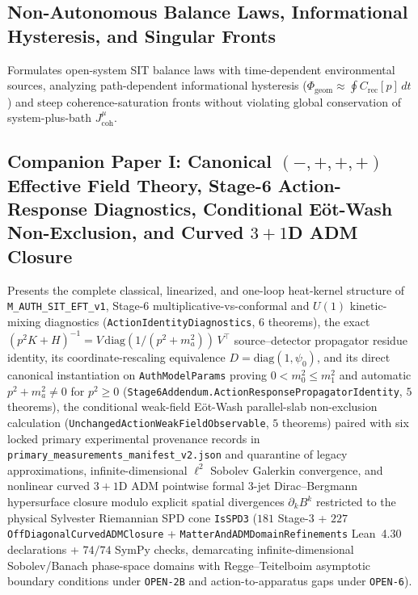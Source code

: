 \subsection{Non-Autonomous Balance Laws, Informational Hysteresis, and Singular Fronts}

Formulates open-system SIT balance laws with time-dependent environmental sources, analyzing path-dependent informational hysteresis ($\Phi_{\mathrm{geom}} \approx \oint C_{\mathrm{rec}}[p]\,dt$) and steep coherence-saturation fronts without violating global conservation of system-plus-bath $J^\mu_{\mathrm{coh}}$.

\subsection{Companion Paper I: Canonical $(-,+,+,+)$ Effective Field Theory, Stage-6 Action-Response Diagnostics, Conditional E\"ot-Wash Non-Exclusion, and Curved $3+1$D ADM Closure}

Presents the complete classical, linearized, and one-loop heat-kernel structure of \texttt{M\_AUTH\_SIT\_EFT\_v1}, Stage-6 multiplicative-vs-conformal and $U(1)$ kinetic-mixing diagnostics (\texttt{ActionIdentityDiagnostics}, $6$ theorems), the exact $(p^2 K + H)^{-1} = V\,\mathrm{diag}(1/(p^2+m_a^2))\,V^\top$ source--detector propagator residue identity, its coordinate-rescaling equivalence $D = \mathrm{diag}(1,\psi_0)$, and its direct canonical instantiation on \texttt{AuthModelParams} proving $0 < m_0^2 \le m_1^2$ and automatic $p^2 + m_a^2 \ne 0$ for $p^2 \ge 0$ (\texttt{Stage6Addendum.\allowbreak{}ActionResponsePropagatorIdentity}, $5$ theorems), the conditional weak-field E\"ot-Wash parallel-slab non-exclusion calculation (\texttt{UnchangedActionWeakFieldObservable}, $5$ theorems) paired with six locked primary experimental provenance records in \texttt{primary\_measurements\_manifest\_v2.json} and quarantine of legacy approximations, infinite-dimensional $\ell^2$ Sobolev Galerkin convergence, and nonlinear curved $3+1$D ADM pointwise formal 3-jet Dirac--Bergmann hypersurface closure modulo explicit spatial divergences $\partial_k B^k$ restricted to the physical Sylvester Riemannian SPD cone \texttt{IsSPD3} ($181$ Stage-3 + $227$ \texttt{Off\allowbreak{}Diagonal\allowbreak{}Curved\allowbreak{}ADMClosure} + \texttt{Matter\allowbreak{}And\allowbreak{}ADMDomain\allowbreak{}Refinements} Lean~4.30 declarations + $74/74$ SymPy checks, demarcating infinite-dimensional Sobolev/Banach phase-space domains with Regge--Teitelboim asymptotic boundary conditions under \texttt{OPEN-2B} and action-to-apparatus gaps under \texttt{OPEN-6}).

